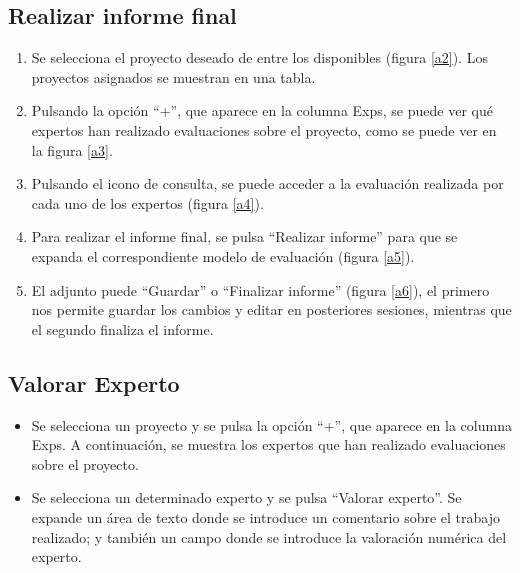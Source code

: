 \documentclass[11pt,a4paper,spanish,twoside]{book}
\begin{document}
\subsection{Realizar informe final}
\begin{enumerate}
\item Se selecciona el proyecto deseado de entre los disponibles (figura 
  \ref{a2}). Los proyectos asignados se muestran en una tabla.
  

\item Pulsando la opción ``+'', que aparece en la columna Exps, se puede ver qué
  expertos han realizado evaluaciones sobre el proyecto, como se puede ver en
  la figura \ref{a3}. 


\item Pulsando el icono de consulta, se puede acceder a la evaluación realizada 
  por cada uno de los expertos (figura \ref{a4}).


\item Para realizar el informe final, se pulsa ``Realizar informe'' 
  para que se expanda el correspondiente modelo de evaluación (figura \ref{a5}).
  

\item El adjunto puede ``Guardar'' o ``Finalizar informe'' 
  (figura \ref{a6}), el primero nos permite guardar los cambios y editar en 
  posteriores sesiones, mientras que el segundo finaliza el informe.
  
\end{enumerate}

\subsection{Valorar Experto}

\begin{itemize}
\item Se selecciona un proyecto y se pulsa la opción ``+'', que aparece en la
  columna Exps. A continuación, se muestra los expertos que han realizado
  evaluaciones sobre el proyecto.
\item Se selecciona un determinado experto y se pulsa ``Valorar experto''. Se
  expande un área de texto donde se introduce un comentario sobre el trabajo
  realizado; y también un campo donde se introduce la valoración numérica del
  experto. 
\end{itemize}
\end{document}
